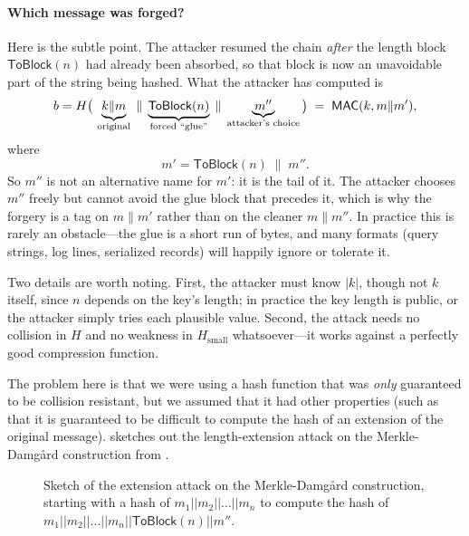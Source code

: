 \paragraph{Which message was forged?}
Here is the subtle point. The attacker resumed the chain \emph{after} the
length block $\mathsf{ToBlock}(n)$ had already been absorbed, so that block is
now an unavoidable part of the string being hashed. What the attacker has
computed is
\[
  b = H\big(\,\underbrace{k \| m}_{\text{original}} \;\|\;
       \underbrace{\mathsf{ToBlock}(n)}_{\text{forced ``glue''}} \;\|\;
       \underbrace{m''}_{\text{attacker's choice}}\big)
  \;=\; \mathsf{MAC}(k, m \| m'),
\]
where
\[
  m' = \mathsf{ToBlock}(n) \;\|\; m''.
\]
So $m''$ is not an alternative name for $m'$: it is the tail of it. The
attacker chooses $m''$ freely but cannot avoid the glue block that precedes
it, which is why the forgery is a tag on $m \| m'$ rather than on the cleaner
$m \| m''$. In practice this is rarely an obstacle---the glue is a short run of
bytes, and many formats (query strings, log lines, serialized records) will
happily ignore or tolerate it.

Two details are worth noting. First, the attacker must know $|k|$, though not
$k$ itself, since $n$ depends on the key's length; in practice the key length
is public, or the attacker simply tries each plausible value. Second, the
attack needs no collision in $H$ and no weakness in $H_\text{small}$
whatsoever---it works against a perfectly good compression function.

The problem here is that we were using a hash
function that was \emph{only} guaranteed to be
collision resistant, but we assumed that it had other
properties (such as that it is guaranteed to be
difficult to compute the hash of an extension of
the original message).  
sketches out the length-extension attack on the Merkle-Damg\aa{}rd
construction from .

\begin{figure}[htpb]
  \centering
  \caption{Sketch of the extension attack on the Merkle-Damg\aa{}rd
    construction, starting with a hash of $m_1 || m_2 || \ldots || m_n$
    to compute the hash of $m_1 || m_2 || \ldots || m_n || \textsf{ToBlock}(n) || m''$.}
  \label{fig:merkle-damgard-extension}
\end{figure}


